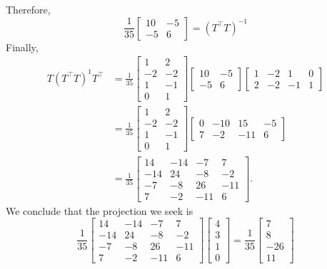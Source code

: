 \documentclass[11pt]{article}
\begin{document}
Therefore,
\[
	\frac{1}{35} \begin{bmatrix} 10 & -5 \\ -5 & 6 \end{bmatrix} = (T^{\top}T)^{-1}
\]
Finally,
\begin{align*}
	T (T^{\top}T)^{1} T^{\top} &= \frac{1}{35} \begin{bmatrix}  1 & 2 \\ -2 & -2 \\ 1 & -1 \\ 0 & 1 \end{bmatrix} \begin{bmatrix} 10 & -5 \\ -5 & 6 \end{bmatrix} \begin{bmatrix} 1 & -2 & 1 & 0 \\ 2 & -2 & -1 & 1 \end{bmatrix} \\
	&= \frac{1}{35} \begin{bmatrix} 1 & 2 \\ -2 & -2 \\ 1 & -1 \\ 0 & 1 \end{bmatrix} \begin{bmatrix} 0 & -10 &  15 & -5 \\ 7 & -2 & -11 & 6 \end{bmatrix} \\
	&= \frac{1}{35} \begin{bmatrix} 14 & -14 & -7 & 7 \\ -14 & 24 & -8 & -2 \\ -7 & -8 & 26 & -11 \\ 7 & -2 & -11 & 6 \end{bmatrix}.
\end{align*}
We conclude that the projection we seek is
\[
	\frac{1}{35} \begin{bmatrix} 14 & -14 & -7 & 7 \\ -14 & 24 & -8 & -2 \\ -7 & -8 & 26 & -11 \\ 7 & -2 & -11 & 6 \end{bmatrix} \begin{bmatrix} 4 \\ 3 \\ 1 \\ 0 \end{bmatrix} = \boxed{\frac{1}{35} \begin{bmatrix} 7 \\ 8 \\ -26 \\ 11 \end{bmatrix}} 
\]
\end{document}
